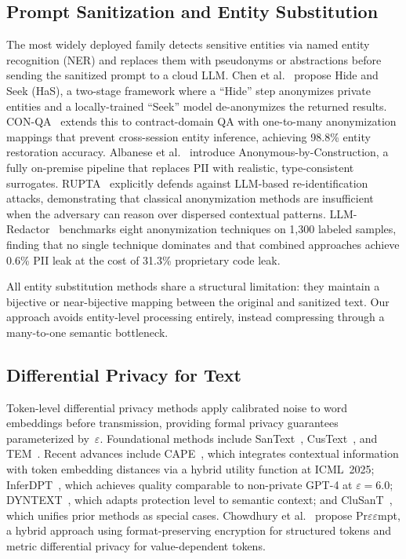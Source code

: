 \documentclass[sigconf,anonymous,review,balance=false]{acmart}
\begin{document}
\subsection{Prompt Sanitization and Entity Substitution}
\label{sec:rw-entity}

The most widely deployed family detects sensitive entities via named entity recognition (NER) and replaces them with pseudonyms or abstractions before sending the sanitized prompt to a cloud LLM.
Chen et al.~\cite{chen2023} propose Hide and Seek (HaS), a two-stage framework where a ``Hide'' step anonymizes private entities and a locally-trained ``Seek'' model de-anonymizes the returned results.
CON-QA~\cite{conqa2025} extends this to contract-domain QA with one-to-many anonymization mappings that prevent cross-session entity inference, achieving 98.8\% entity restoration accuracy.
Albanese et al.~\cite{albanese2026} introduce Anonymous-by-Construction, a fully on-premise pipeline that replaces PII with realistic, type-consistent surrogates.
RUPTA~\cite{yang2025} explicitly defends against LLM-based re-identification attacks, demonstrating that classical anonymization methods are insufficient when the adversary can reason over dispersed contextual patterns.
LLM-Redactor~\cite{agyemang2026} benchmarks eight anonymization techniques on 1,300 labeled samples, finding that no single technique dominates and that combined approaches achieve 0.6\% PII leak at the cost of 31.3\% proprietary code leak.

All entity substitution methods share a structural limitation: they maintain a bijective or near-bijective mapping between the original and sanitized text. Our approach avoids entity-level processing entirely, instead compressing through a many-to-one semantic bottleneck.

\subsection{Differential Privacy for Text}
\label{sec:rw-dp}

Token-level differential privacy methods apply calibrated noise to word embeddings before transmission, providing formal privacy guarantees parameterized by~$\varepsilon$.
Foundational methods include SanText~\cite{yue2021}, CusText~\cite{chen2023custext}, and TEM~\cite{tem2021}.
Recent advances include CAPE~\cite{cape2025}, which integrates contextual information with token embedding distances via a hybrid utility function at ICML~2025; InferDPT~\cite{inferdpt2023}, which achieves quality comparable to non-private GPT-4 at $\varepsilon = 6.0$; DYNTEXT~\cite{dyntext2025}, which adapts protection level to semantic context; and CluSanT~\cite{clusant2025}, which unifies prior methods as special cases.
Chowdhury et al.~\cite{chowdhury2025} propose Pr$\varepsilon\varepsilon$mpt, a hybrid approach using format-preserving encryption for structured tokens and metric differential privacy for value-dependent tokens.
\end{document}
